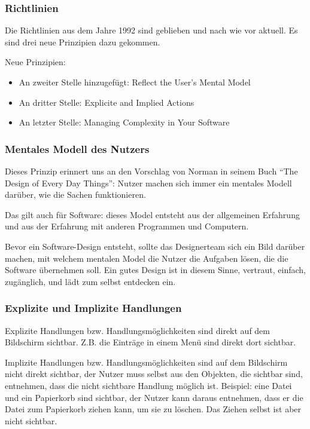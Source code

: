 \subsubsection{Richtlinien}
Die Richtlinien aus dem Jahre 1992 sind geblieben und nach wie vor aktuell. Es sind drei neue Prinzipien dazu gekommen.\bigskip

Neue Prinzipien:
\begin{itemize}
\item An zweiter Stelle hinzugefügt: Reflect the User's Mental Model 
\item An dritter Stelle: Explicite and Implied Actions
\item An letzter Stelle: Managing Complexity in Your Software
\end{itemize}

\subsubsection*{Mentales Modell des Nutzers}
Dieses Prinzip erinnert uns an den Vorschlag von Norman in seinem Buch “The Design of Every Day Things”: Nutzer machen sich immer ein mentales Modell darüber, wie die Sachen funktionieren.

Das gilt auch für Software: dieses Model entsteht aus der allgemeinen Erfahrung und aus der Erfahrung mit anderen Programmen und Computern.

Bevor ein Software-Design entsteht, sollte das Designerteam sich ein Bild darüber machen, mit welchem mentalen Model die Nutzer die Aufgaben lösen, die die Software übernehmen soll. Ein gutes Design ist in diesem Sinne, vertraut, einfach, zugänglich, und lädt zum selbst entdecken ein.

\subsubsection*{Explizite und Implizite Handlungen}
Explizite Handlungen bzw. Handlungsmöglichkeiten sind direkt auf dem Bildschirm sichtbar. Z.B. die Einträge in einem Menü sind direkt dort sichtbar.

Implizite Handlungen bzw. Handlungsmöglichkeiten sind auf dem Bildschirm nicht direkt sichtbar, der Nutzer muss selbst aus den Objekten, die sichtbar sind, entnehmen, dass die nicht sichtbare Handlung möglich ist. Beispiel: eine Datei und ein Papierkorb sind sichtbar, der Nutzer kann daraus entnehmen, dass er die Datei zum Papierkorb ziehen kann, um sie zu löschen. Das Ziehen selbst ist aber nicht sichtbar.

